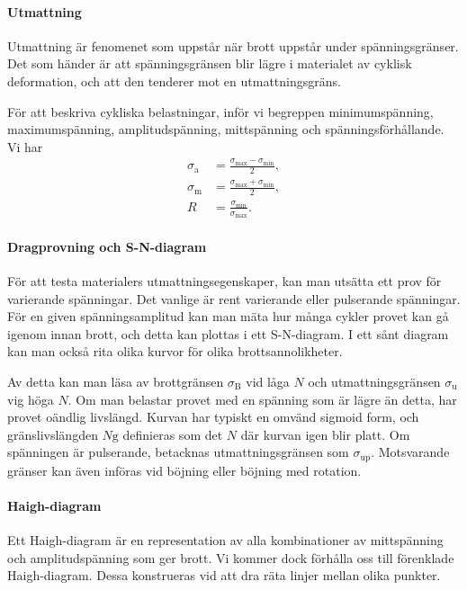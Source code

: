 \paragraph{Utmattning}
Utmattning är fenomenet som uppstår när brott uppstår under spänningsgränser. Det som händer är att spänningsgränsen blir lägre i materialet av cyklisk deformation, och att den tenderer mot en utmattningsgräns.

För att beskriva cykliska belastningar, inför vi begreppen minimumspänning, maximumspänning, amplitudspänning, mittspänning och spänningsförhållande. Vi har
\begin{align*}
	\sigma_{\text{a}} &= \frac{\sigma_{\text{max}} - \sigma_{\text{min}}}{2}, \\
	\sigma_{\text{m}} &= \frac{\sigma_{\text{max}} + \sigma_{\text{min}}}{2}, \\
	R                 &= \frac{\sigma_{\text{min}}}{\sigma_{\text{max}}}.
\end{align*}

\paragraph{Dragprovning och S-N-diagram}
För att testa materialers utmattningsegenskaper, kan man utsätta ett prov för varierande spänningar. Det vanlige är rent varierande eller pulserande spänningar. För en given spänningsamplitud kan man mäta hur många cykler provet kan gå igenom innan brott, och detta kan plottas i ett S-N-diagram. I ett sånt diagram kan man också rita olika kurvor för olika brottsannolikheter.

Av detta kan man läsa av brottgränsen $\sigma_{\text{B}}$ vid låga $N$ och utmattningsgränsen $\sigma_{\text{u}}$ vig höga $N$. Om man belastar provet med en spänning som är lägre än detta, har provet oändlig livslängd. Kurvan har typiskt en omvänd sigmoid form, och gränslivslängden $N{\text{g}}$ definieras som det $N$ där kurvan igen blir platt. Om spänningen är pulserande, betacknas utmattningsgränsen som $\sigma_{\text{up}}$. Motsvarande gränser kan även införas vid böjning eller böjning med rotation.

\paragraph{Haigh-diagram}
Ett Haigh-diagram är en representation av alla kombinationer av mittspänning och amplitudspänning som ger brott. Vi kommer dock förhålla oss till förenklade Haigh-diagram. Dessa konstrueras vid att dra räta linjer mellan olika punkter.

